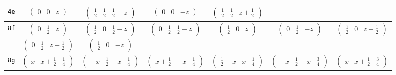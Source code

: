 \documentclass[fleqn,9pt,landscape]{jsarticle}
\begin{document}
\begin{center}
\begin{longtable}{ccccccc}
{\tt 4e} & $ \begin{pmatrix} 0 & 0 & z \end{pmatrix} $ & $ \begin{pmatrix} \frac{1}{2} & \frac{1}{2} & \frac{1}{2} - z \end{pmatrix} $ & $ \begin{pmatrix} 0 & 0 & - z \end{pmatrix} $ & $ \begin{pmatrix} \frac{1}{2} & \frac{1}{2} & z + \frac{1}{2} \end{pmatrix} $ & $  $ & $  $ \\ \hline
{\tt 8f} & $ \begin{pmatrix} 0 & \frac{1}{2} & z \end{pmatrix} $ & $ \begin{pmatrix} \frac{1}{2} & 0 & \frac{1}{2} - z \end{pmatrix} $ & $ \begin{pmatrix} 0 & \frac{1}{2} & \frac{1}{2} - z \end{pmatrix} $ & $ \begin{pmatrix} \frac{1}{2} & 0 & z \end{pmatrix} $ & $ \begin{pmatrix} 0 & \frac{1}{2} & - z \end{pmatrix} $ & $ \begin{pmatrix} \frac{1}{2} & 0 & z + \frac{1}{2} \end{pmatrix} $ \\
& $ \begin{pmatrix} 0 & \frac{1}{2} & z + \frac{1}{2} \end{pmatrix} $ & $ \begin{pmatrix} \frac{1}{2} & 0 & - z \end{pmatrix} $ & $  $ & $  $ & $  $ & $  $ \\ \hline
{\tt 8g} & $ \begin{pmatrix} x & x + \frac{1}{2} & \frac{1}{4} \end{pmatrix} $ & $ \begin{pmatrix} - x & \frac{1}{2} - x & \frac{1}{4} \end{pmatrix} $ & $ \begin{pmatrix} x + \frac{1}{2} & - x & \frac{1}{4} \end{pmatrix} $ & $ \begin{pmatrix} \frac{1}{2} - x & x & \frac{1}{4} \end{pmatrix} $ & $ \begin{pmatrix} - x & \frac{1}{2} - x & \frac{3}{4} \end{pmatrix} $ & $ \begin{pmatrix} x & x + \frac{1}{2} & \frac{3}{4} \end{pmatrix} $ \\

\end{longtable}
\end{center}
\end{document}
